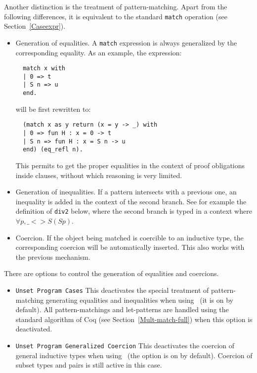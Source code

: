 Another distinction is the treatment of pattern-matching. Apart from the
following differences, it is equivalent to the standard {\tt match}
operation (see Section~\ref{Caseexpr}).
\begin{itemize}
\item Generation of equalities. A {\tt match} expression is always
  generalized by the corresponding equality. As an example,
  the expression: 

\begin{verbatim}
  match x with
  | 0 => t
  | S n => u
  end.
\end{verbatim}
will be first rewritten to:
\begin{verbatim}
  (match x as y return (x = y -> _) with
  | 0 => fun H : x = 0 -> t
  | S n => fun H : x = S n -> u
  end) (eq_refl n).
\end{verbatim}

  This permits to get the proper equalities in the context of proof
  obligations inside clauses, without which reasoning is very limited.

\item Generation of inequalities. If a pattern intersects with a
  previous one, an inequality is added in the context of the second
  branch. See for example the definition of {\tt div2} below, where the second
  branch is typed in a context where $\forall p, \_ <> S (S p)$.

\item Coercion. If the object being matched is coercible to an inductive
  type, the corresponding coercion will be automatically inserted. This also
  works with the previous mechanism.

\end{itemize}

There are options to control the generation of equalities
and coercions.

\begin{itemize}
\item {\tt Unset Program Cases} This deactivates
  the special treatment of pattern-matching generating equalities and
  inequalities when using \Program\ (it is on by default). All
  pattern-matchings and let-patterns are handled using the standard
  algorithm of Coq (see Section~\ref{Mult-match-full}) when this option is
  deactivated.
\item {\tt Unset Program Generalized Coercion} This deactivates the coercion of general
  inductive types when using \Program\ (the option is on by default).
  Coercion of subset types and pairs is still active in this case.
\end{itemize}

